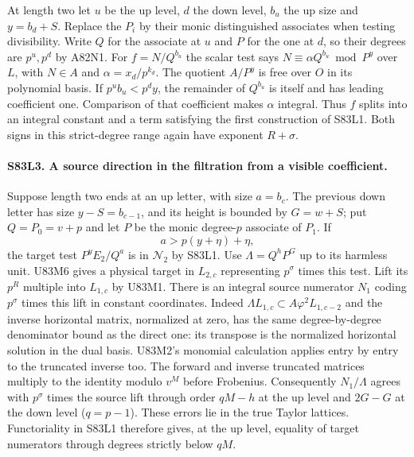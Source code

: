 At length two let $u$ be the up level, $d$ the down level,
$b_u$ the up size and $y=b_d+S$. Replace the $P_i$ by their
monic distinguished associates when testing divisibility. Write
$Q$ for the associate at $u$ and $P$ for the one at $d$, so
their degrees are $p^u,p^d$ by A82N1. For $f=N/Q^{b_u}$ the
scalar test says $N\equiv\alpha Q^{b_u}\bmod P^y$ over $L$,
with $N\in A$ and $\alpha=x_d/p^{k_d}$. The quotient $A/P^y$
is free over $O$ in its polynomial basis. If
$p^u b_u<p^d y$, the remainder of $Q^{b_u}$ is itself and has
leading coefficient one. Comparison of that coefficient makes
$\alpha$ integral. Thus $f$ splits into an integral constant and
a term satisfying the first construction of S83L1. Both signs
in this strict-degree range again have exponent $R+\sigma$.

\paragraph{S83L3. A source direction in the filtration from a visible coefficient.}
Suppose length two ends at an up letter, with size $a=b_c$.
The previous down letter has size $y-S=b_{c-1}$, and its height
is bounded by $G=w+S$; put $Q=P_0=v+p$ and let $P$ be the
monic degree-$p$ associate of $P_1$. If
\[
                    a>p(y+\eta)+\eta ,
\]
the target test $P^y E_2/Q^a$ is in $\mathcal N_2$ by S83L1.
Use $\Lambda=Q^h P^G$ up to its harmless unit. U83M6 gives
a physical target in $L_{2,c}$ representing $p^\sigma$ times
this test. Lift its $p^R$ multiple into $L_{1,c}$ by U83M1.
There is an integral source numerator $N_1$ coding $p^\sigma$
times this lift in constant coordinates. Indeed
$\Lambda L_{1,c}\subset A\varphi^2 L_{1,c-2}$ and the inverse
horizontal matrix, normalized at zero, has the same degree-by-degree
denominator bound as the direct one: its transpose is the
normalized horizontal solution in the dual basis. U83M2's monomial
calculation applies entry by entry to the truncated inverse too.
The forward and inverse truncated matrices multiply to the identity
modulo $v^M$ before Frobenius. Consequently $N_1/\Lambda$ agrees
with $p^\sigma$ times the source lift through order $qM-h$ at the
up level and $2G-G$ at the down level ($q=p-1$). These errors
lie in the true Taylor lattices. Functoriality in S83L1 therefore
gives, at the up level, equality of target numerators through
degrees strictly below $qM$.

